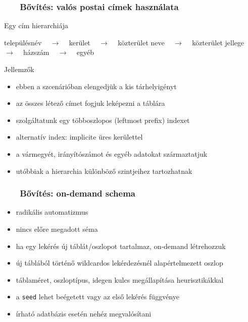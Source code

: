\documentclass[
]{beamer}
\newcommand{\slidetitle}[2]{\frametitle{{\small #1 ~ \ding{226} ~ } \normalsize \textbf{#2} }}
\begin{document}
\begin{frame}
    \slidetitle{\sectionshorttitle}{Bővítés: valós postai címek használata}
    
    {\color{beamer@blendedblue}Egy cím hierarchiája}
    
    \begin{center}
        településnév ~ $\rightarrow$ ~
        kerület ~ $\rightarrow$ ~
        közterület neve ~ $\rightarrow$ ~
        közterület jellege ~ $\rightarrow$ ~
        házszám ~ $\rightarrow$ ~
        egyéb
    \end{center}
    
    \vspace{0.5em}
    
    {\color{beamer@blendedblue}Jellemzők}
    
    \begin{itemize}
        \setlength\itemsep{0.3em}
        \item ebben a szcenárióban elengedjük a kis tárhelyigényt
        \item az összes létező címet fogjuk leképezni a táblára
        \item szolgáltatunk egy többoszlopos (leftmost prefix) indexet
        \item alternatív index: implicite üres kerülettel
        \item a vármegyét, irányítószámot és egyéb adatokat származtatjuk
        \item utóbbiak a hierarchia különböző szintjeihez tartozhatnak
    \end{itemize}
\end{frame}

\begin{frame}
    \slidetitle{\sectionshorttitle}{Bővítés: on-demand schema}
    
    \begin{itemize}
        \setlength\itemsep{1em}
        \item {\color{red} radikális automatizmus}
        \item nincs előre megadott séma
        \item ha egy lekérés új táblát/oszlopot tartalmaz, on-demand létrehozzuk
        \item új táblából történő wildcardos lekérdezésnél alapértelmezett oszlop
        \item táblaméret, oszloptípus, idegen kulcs megállapítása heurisztikákkal
        \item a \texttt{seed} lehet beégetett vagy az első lekérés függvénye
        \item írható adatbázis esetén nehéz megvalósítani
    \end{itemize}
\end{frame}
\end{document}
